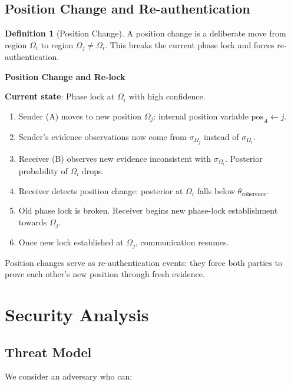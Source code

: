 \documentclass[11pt,a4paper]{article}
\theoremstyle{definition}
\newtheorem{definition}{Definition}[section]
\begin{document}
\subsection{Position Change and Re-authentication}

\begin{definition}[Position Change]
A position change is a deliberate move from region $\Omega_i$ to region $\Omega_j \neq \Omega_i$. This breaks the current phase lock and forces re-authentication.
\end{definition}

\begin{algorithm}
\textbf{Position Change and Re-lock}

\textbf{Current state}: Phase lock at $\Omega_i$ with high confidence.

\begin{enumerate}
\item Sender (A) moves to new position $\Omega_j$: internal position variable $\text{pos}_A \leftarrow j$.
\item Sender's evidence observations now come from $\sigma_{\Omega_j}$ instead of $\sigma_{\Omega_i}$.
\item Receiver (B) observes new evidence inconsistent with $\sigma_{\Omega_i}$. Posterior probability of $\Omega_i$ drops.
\item Receiver detects position change: posterior at $\Omega_i$ falls below $\theta_{\text{coherence}}$.
\item Old phase lock is broken. Receiver begins new phase-lock establishment towards $\Omega_j$.
\item Once new lock established at $\Omega_j$, communication resumes.
\end{enumerate}
\end{algorithm}

Position changes serve as re-authentication events: they force both parties to prove each other's new position through fresh evidence.

\section{Security Analysis}
\label{sec:security}

\subsection{Threat Model}

We consider an adversary who can:
\end{document}
